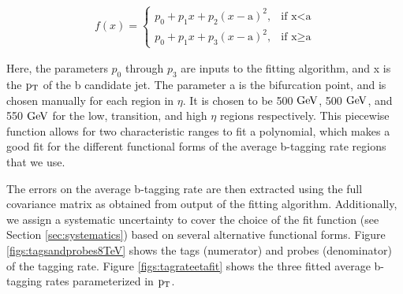 \begin{eqnarray}
f(x) =
\begin{cases}
p_0+p_1x+p_2(x-\text{a})^2, & \text{if x} < \text{a} \\
p_0+p_1x+p_3(x-\text{a})^2, & \text{if x}\geq\text{a}
\end{cases}
\end{eqnarray}

Here, the parameters $p_0$ through $p_3$ are inputs to the fitting algorithm, and x is the $\mathrm{p_{T}}$ of the b candidate jet.  The parameter a is the bifurcation point, and is chosen manually for each region in $\eta$.
It is chosen to be 500$~\mathrm{GeV}$, 500$~\mathrm{GeV}$, and 550$~\mathrm{GeV}$ for the low, transition, and high $\eta$ regions respectively.
This piecewise function allows for two characteristic ranges to fit a polynomial, which makes a good fit for the different functional forms of the average b-tagging rate regions that we use.

The errors on the average b-tagging rate are then extracted using the full covariance matrix as obtained from output of the fitting 
algorithm.   
Additionally, we assign a systematic uncertainty to cover the choice of the fit function (see Section \ref{sec:systematics}) based on several alternative functional forms.
Figure \ref{figs:tagsandprobes8TeV} shows the tags (numerator) and probes (denominator) of the tagging rate.
Figure \ref{figs:tagrateetafit} shows the three fitted average b-tagging rates parameterized in $\mathrm{p_{T}}$.  


